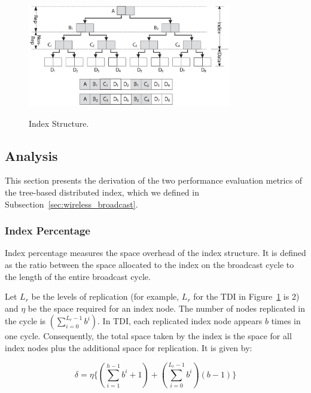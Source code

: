 \begin{figure}[!t]
\begin{center}
\includegraphics[width=3.5in]{Figures/bcast_struct.eps}
\caption{Index Structure.} \vspace*{-10pt}
\label{fig:index_struct}
\end{center}
\end{figure}


\subsection{Analysis}

This section presents the derivation of the two performance
evaluation metrics of the tree-based distributed index, which we
defined in Subsection~\ref{sec:wireless_broadcast}.

\subsubsection{Index Percentage}

Index percentage measures the space overhead of the index
structure. It is defined as the ratio between the space allocated
to the index on the broadcast cycle to the length of the entire
broadcast cycle.

Let $L_r$ be the levels of replication (for example, $L_r$ for the
TDI in Figure~\ref{fig:index_struct} is 2) and $\eta$ be the space
required for an index node. The number of nodes replicated in the
cycle is $(\displaystyle\sum\limits_{i=0}^{L_r-1} b^i)$. In TDI,
each replicated index node appears $b$ times in one cycle.
Consequently, the total space taken by the index is the space for
all index nodes plus the additional space for replication. It is
given by:

\begin{equation}
\delta = \eta\{(\displaystyle\sum\limits_{i=1}^{h-1} b^i + 1) +
(\displaystyle\sum\limits_{i=0}^{L_r-1} b^i)(b - 1)\}
\end{equation}

